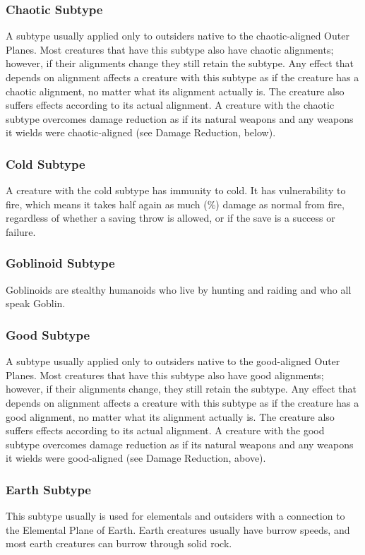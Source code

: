 {\subsubsection{Chaotic Subtype} A subtype usually applied only to outsiders native to the chaotic-aligned Outer Planes. Most creatures that have this subtype also have chaotic alignments; however, if their alignments change they still retain the subtype. Any effect that depends on alignment affects a creature with this subtype as if the creature has a chaotic alignment, no matter what its alignment actually is. The creature also suffers effects according to its actual alignment. A creature with the chaotic subtype overcomes damage reduction as if its natural weapons and any weapons it wields were chaotic-aligned (see Damage Reduction, below).

\subsubsection{Cold Subtype} A creature with the cold subtype has immunity to cold. It has vulnerability to fire, which means it takes half again as much (\%) damage as normal from fire, regardless of whether a saving throw is allowed, or if the save is a success or failure. 

\subsubsection{Goblinoid Subtype} Goblinoids are stealthy humanoids who live by hunting and raiding and who all speak Goblin.

\subsubsection{Good Subtype} A subtype usually applied only to outsiders native to the good-aligned Outer Planes. Most creatures that have this subtype also have good alignments; however, if their alignments change, they still retain the subtype. Any effect that depends on alignment affects a creature with this subtype as if the creature has a good alignment, no matter what its alignment actually is. The creature also suffers effects according to its actual alignment. A creature with the good subtype overcomes damage reduction as if its natural weapons and any weapons it wields were good-aligned (see Damage Reduction, above).

\subsubsection{Earth Subtype} This subtype usually is used for elementals and outsiders with a connection to the Elemental Plane of Earth. Earth creatures usually have burrow speeds, and most earth creatures can burrow through solid rock.

}
